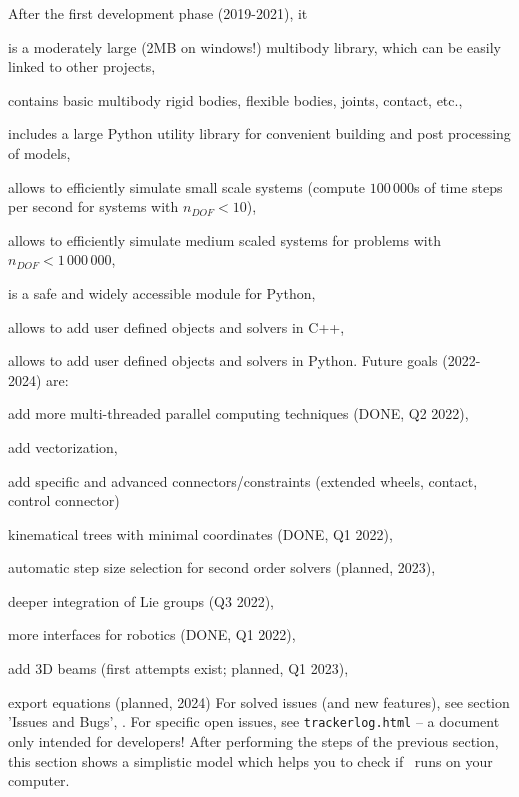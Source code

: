 After the first development phase (2019-2021), it
\bi
  \item is a moderately large (2MB on windows!) multibody library, which can be easily linked to other projects,
  \item contains basic multibody rigid bodies, flexible bodies, joints, contact, etc.,
  \item includes a large Python utility library for convenient building and post processing of models,
  \item allows to efficiently simulate small scale systems (compute $100\,000$s of time steps per second for systems with $n_{DOF}<10$),
  \item allows to efficiently simulate medium scaled systems for problems with $n_{DOF} < 1\,000\,000$,
  \item is a safe and widely accessible module for Python,
  \item allows to add user defined objects and solvers in C++,
  \item allows to add user defined objects and solvers in Python.
\ei
Future goals (2022-2024) are:
\bi
  \item add more multi-threaded parallel computing techniques (DONE, Q2 2022),
  \item add vectorization,
  \item add specific and advanced connectors/constraints (extended wheels, contact, control connector)
  \item kinematical trees with minimal coordinates (DONE, Q1 2022),
  \item automatic step size selection for second order solvers (planned, 2023),
  \item deeper integration of Lie groups (Q3 2022),
  \item more interfaces for robotics (DONE, Q1 2022),
  \item add 3D beams (first attempts exist; planned, Q1 2023),
  \item export equations (planned, 2024)
\ei
For solved issues (and new features), see section 'Issues and Bugs', .
For specific open issues, see \texttt{trackerlog.html} -- a document only intended for developers!
%
After performing the steps of the previous section, this section shows a simplistic model which helps you to check if \codeName\ runs on your computer.

